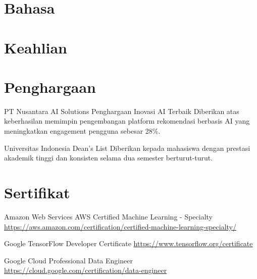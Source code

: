 \documentclass[a4paper, serif, 10pt]{moderncv}
\begin{document}
\section{Bahasa}

\section{Keahlian}

\section{Penghargaan}

        {PT Nusantara AI Solutions}
        {Penghargaan Inovasi AI Terbaik}
        {}
        {}
        {Diberikan atas keberhasilan memimpin pengembangan platform rekomendasi berbasis AI yang meningkatkan engagement pengguna sebesar 28\%.}

        {Universitas Indonesia}
        {Dean's List}
        {}
        {}
        {Diberikan kepada mahasiswa dengan prestasi akademik tinggi dan konsisten selama dua semester berturut-turut.}
\section{Sertifikat}

        {Amazon Web Services}
        {AWS Certified Machine Learning - Specialty}
        {\url{https://aws.amazon.com/certification/certified-machine-learning-specialty/}}
        {}
        {}

        {Google}
        {TensorFlow Developer Certificate}
        {\url{https://www.tensorflow.org/certificate}}
        {}
        {}

        {Google Cloud}
        {Professional Data Engineer}
        {\url{https://cloud.google.com/certification/data-engineer}}
        {}
        {}
\end{document}

